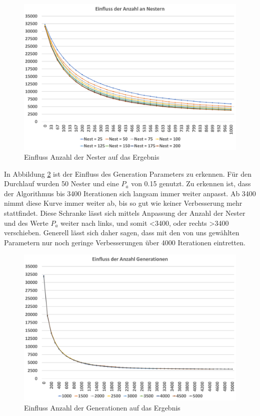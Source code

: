 \documentclass[conference]{IEEEtran}
\begin{document}
      \begin{figure}[H]
        \centering
        \includegraphics[width=0.8\linewidth]{Nester.png}
        \caption{Einfluss Anzahl der Nester auf das Ergebnis}
        \label{fig:nests}
      \end{figure}

      In Abbildung \ref{fig:generation} ist der Einfluss des Generation Parameters zu erkennen. Für den Durchlauf wurden 50 Nester und eine $P_a$ von 0.15 genutzt. 
      Zu erkennen ist, dass der Algorithmus bis 3400 Iterationen sich langsam immer weiter anpasst. Ab 3400 nimmt diese Kurve immer weiter ab, bis so gut wie keiner Verbesserung
      mehr stattfindet. Diese Schranke lässt sich mittels Anpassung der Anzahl der Nester und des Werte $P_a$ weiter nach links, und somit <3400, oder rechts >3400 verschieben.
      Generell lässt sich daher sagen, dass mit den von uns gewählten Parametern nur noch geringe Verbesserungen über 4000 Iterationen eintretten.

      \begin{figure}[H]
        \centering
        \includegraphics[width=0.8\linewidth]{Generation.png}
        \caption{Einfluss Anzahl der Generationen auf das Ergebnis}
        \label{fig:generation}
      \end{figure}
\end{document}
